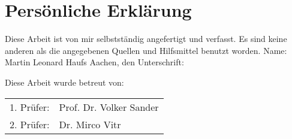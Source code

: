 \chapter*{Persönliche Erklärung}
\begin{flushleft}
Diese Arbeit ist von mir selbstständig angefertigt und verfasst. 
Es sind keine anderen als die angegebenen Quellen und Hilfsmittel benutzt worden.
\linebreak
\linebreak
    Name: Martin Leonard Haufs
    \linebreak 
    Aachen, den \dateOfSubmission%
    \linebreak	
    \linebreak
    Unterschrift: \underline{\hspace{5cm}}
    	
    \vspace{2.0cm}
    Diese Arbeit wurde betreut von: \linebreak
    
    \begin{tabular*}{\linewidth}{ll}
    	1. Prüfer: & Prof. Dr. Volker Sander\\
    	2. Prüfer: & Dr. Mirco Vitr
    \end{tabular*}

\end{flushleft}